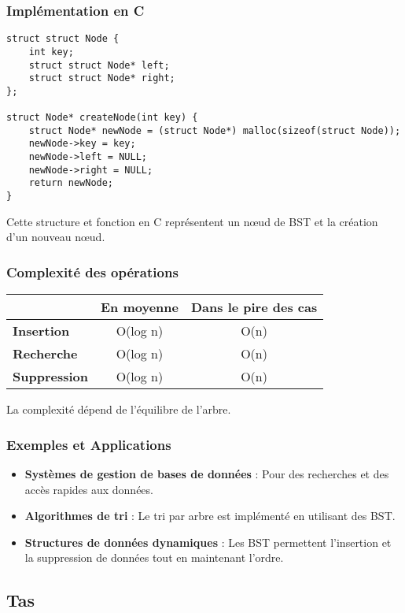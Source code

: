\newpage
\subsubsection{Implémentation en C}
\begin{lstlisting}[label={lst:imp_BST}]
struct struct Node {
    int key;
    struct struct Node* left;
    struct struct Node* right;
};

struct Node* createNode(int key) {
    struct Node* newNode = (struct Node*) malloc(sizeof(struct Node));
    newNode->key = key;
    newNode->left = NULL;
    newNode->right = NULL;
    return newNode;
}
\end{lstlisting}
Cette structure et fonction en C représentent un nœud de BST et la création d'un nouveau nœud.

\subsubsection{Complexité des opérations}
\begin{tabular}{|l|c|c|}
\hline
 & \textbf{En moyenne} & \textbf{Dans le pire des cas} \\
\hline
\textbf{Insertion} & O(log n) & O(n) \\
\hline
\textbf{Recherche} & O(log n) & O(n) \\
\hline
\textbf{Suppression} & O(log n) & O(n) \\
\hline
\end{tabular}
La complexité dépend de l'équilibre de l'arbre.

\subsubsection{Exemples et Applications}
\begin{itemize}
    \item \textbf{Systèmes de gestion de bases de données} : Pour des recherches et des accès rapides aux données.
    \item \textbf{Algorithmes de tri} : Le tri par arbre est implémenté en utilisant des BST.
    \item \textbf{Structures de données dynamiques} : Les BST permettent l'insertion et la suppression de données tout en maintenant l'ordre.
\end{itemize}


\subsection{Tas}\label{subsec:tas}

